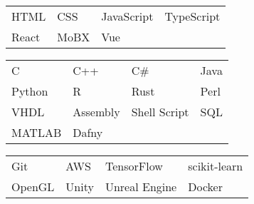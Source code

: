 \documentclass[paper=a4,fontsize=10pt]{resume}
\begin{document}
{	
		\begin{tabular}{llll}
			HTML & CSS & JavaScript & TypeScript \\
			React & MoBX & Vue
		\end{tabular}

		\medskip\normalsize

		\begin{tabular}{llll}
			C & C++ & C\# & Java \\
			Python & R & Rust & Perl \\
			VHDL & Assembly & Shell Script & SQL \\
			MATLAB & Dafny
		\end{tabular}

		\medskip\normalsize

		\begin{tabular}{llll}
			Git & AWS & TensorFlow & scikit-learn \\
			OpenGL & Unity & Unreal Engine & Docker
		\end{tabular}
}
\end{document}
